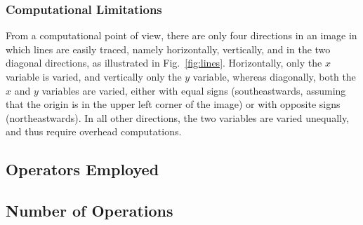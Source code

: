 \subsubsection{Computational Limitations}


From a computational point of view, there are only four directions in
an image in which lines are easily traced, namely horizontally,
vertically, and in the two diagonal directions, as illustrated in
Fig.~\ref{fig:lines}.  Horizontally, only the $x$ variable is varied,
and vertically only the $y$ variable, whereas diagonally, both the $x$
and $y$ variables are varied, either with equal signs (southeastwards,
assuming that the origin is in the upper left corner of the image) or
with opposite signs (northeastwards).  In all other directions, the
two variables are varied unequally, and thus require overhead
computations.

\subsection{Operators Employed}
\label{algo:pos:operators}

\subsection{Number of Operations}
\label{algo:pos:O}


